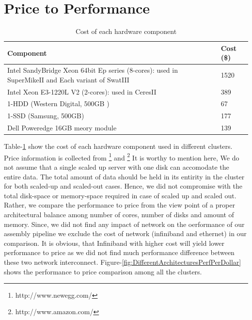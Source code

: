 \documentclass[conference]{IEEEtran}
\begin{document}
\section {Price to Performance} \label{PriceToPerformance}
\begin{table}
\begin{center}
	\begin{tabular}{ |p{5cm} | p{3cm} |} \hline
		Component & Cost (\$)\\ \hline
		Intel SandyBridge Xeon 64bit Ep series (8-cores): used in SuperMikeII and Each variant of SwatIII & 1520\\ \hline
		Intel Xeon E3-1220L V2 (2-cores): used in CeresII & 389\\ \hline
		1-HDD (Western Digital, 500GB ) & 67\\ \hline
		1-SSD (Samsung, 500GB) & 177\\ \hline
		Dell Poweredge 16GB meory module & 139\\ \hline
	\end{tabular}
	\caption{Cost of each hardware component}
	\label{table:PriceOfEachComponent}
\end{center}
\end{table}
Table-\ref{table:PriceOfEachComponent} show the cost of each hardware component used in different clusters.
Price information is collected from \footnote{http://www.newegg.com/} and \footnote{http://www.amazon.com/}
It is worthy to mention here, We do not assume that a single scaled up server with one disk can accomodate the entire data.
The total amount of data should be held in its entirity in the cluster for both scaled-up and scaled-out cases.
Hence, we did not compromise with the total disk-space or memory-space required in case of scaled up and scaled out.
Rather, we compare the performance to price from the view point of a proper architectural balance among number of cores, number of disks and amount of memory.
Since, we did not find any impact of network on the oerformance of our assembly pipeline we exclude the cost of network (infiniband and ethernet) in our comparison. It is obvious, that Infiniband with higher cost will yield lower performance to price as we did not find much performance difference between these two network interconnect. 
Figure-\ref{fig:DifferentArchitecturesPerfPerDollar} shows the performance to price comparison among all the clusters.
\end{document}
